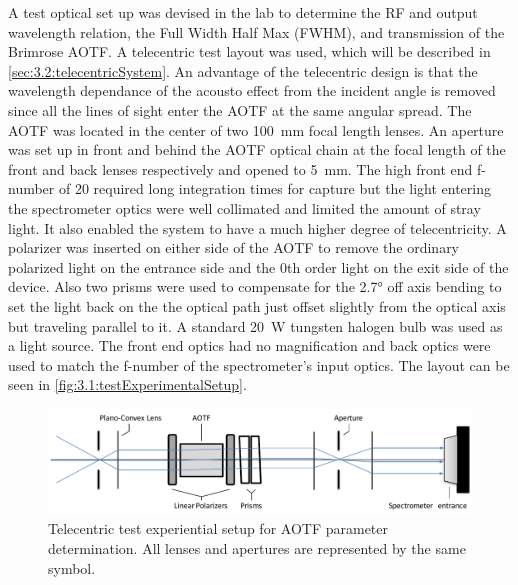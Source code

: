 A test optical set up was devised in the lab to determine the RF and output wavelength relation, the Full Width Half Max (FWHM), and transmission of the Brimrose AOTF. A telecentric test layout was used, which will be described in \autoref{sec:3.2:telecentricSystem}. An advantage of the telecentric design is that the wavelength dependance of the acousto effect from the incident angle is removed since all the lines of sight enter the AOTF at the same angular spread. The AOTF was located in the center of two 100~mm focal length lenses. An aperture was set up in front and behind the AOTF optical chain at the focal length of the front and back lenses respectively and opened to 5~mm. The high front end f-number of 20 required long integration times for capture but the light entering the spectrometer optics were well collimated and limited the amount of stray light. It also enabled the system to have a much higher degree of telecentricity. A polarizer was inserted on either side of the AOTF to remove the ordinary polarized light on the entrance side and the 0th order light on the exit side of the device. Also two prisms were used to compensate for the 2.7\si{\degree} off axis bending to set the light back on the the optical path just offset slightly from the optical axis but traveling parallel to it. A standard 20~W tungsten halogen bulb was used as a light source. The front end optics had no magnification and back optics were used to match the f-number of the spectrometer's input optics. The layout can be seen in \autoref{fig:3.1:testExperimentalSetup}.

\begin{figure}
    \includegraphics[width=1.0\textwidth]{./Images/3-1-TestExperimentalSetUp.pdf}
    \caption[AOTF Calibration Experimental Setup]{Telecentric test experiential setup for AOTF parameter determination. All lenses and apertures are represented by the same symbol.}
    \label{fig:3.1:testExperimentalSetup}
\end{figure}


